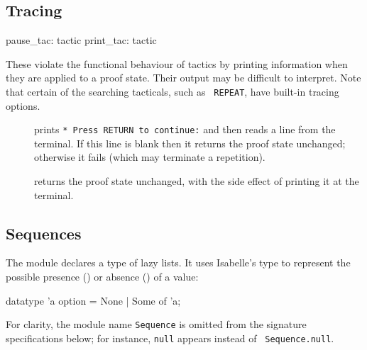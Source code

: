 \subsection{Tracing}
\begin{ttbox} 
pause_tac: tactic
print_tac: tactic
\end{ttbox}
These violate the functional behaviour of tactics by printing information
when they are applied to a proof state.  Their output may be difficult to
interpret.  Note that certain of the searching tacticals, such as {\tt
REPEAT}, have built-in tracing options.
\begin{description}
\item[] 
prints {\tt** Press RETURN to continue:} and then reads a line from the
terminal.  If this line is blank then it returns the proof state unchanged;
otherwise it fails (which may terminate a repetition).

\item[] 
returns the proof state unchanged, with the side effect of printing it at
the terminal.
\end{description}


\subsection{Sequences}
The module  declares a type of lazy lists.  It uses
Isabelle's type  to represent the possible presence
() or absence () of
a value:
\begin{ttbox}
datatype 'a option = None  |  Some of 'a;
\end{ttbox}
For clarity, the module name {\tt Sequence} is omitted from the signature
specifications below; for instance, {\tt null} appears instead of {\tt
  Sequence.null}.

